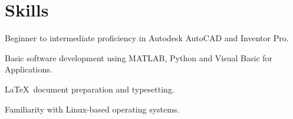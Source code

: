 \documentclass[letterpaper,10pt]{resume}
\begin{document}
\section{Skills}
	\begin{compactitem}
	\item Beginner to intermediate proficiency in Autodesk AutoCAD and Inventor Pro.
	\item Basic software development using MATLAB, Python and Visual Basic for Applications.
	\item \LaTeX\ document preparation and typesetting.
	\item Familiarity with Linux-based operating systems.
	\end{compactitem}
\end{document}
